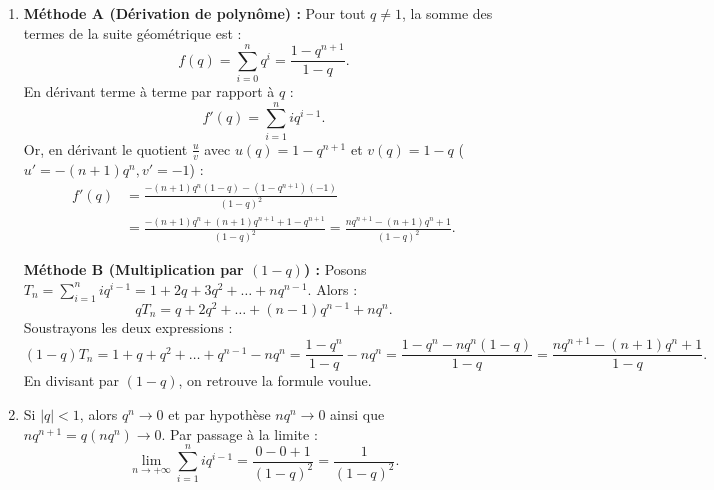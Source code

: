 \documentclass[11pt,a4paper]{article}
\begin{document}
\begin{correctionbox}
\begin{enumerate}
    \item
    \textbf{Méthode A (Dérivation de polynôme) :}
    Pour tout $q \ne 1$, la somme des termes de la suite géométrique est :
    \[
    f(q) = \sum_{i=0}^n q^i = \frac{1 - q^{n+1}}{1 - q}.
    \]
    En dérivant terme à terme par rapport à $q$ :
    \[
    f'(q) = \sum_{i=1}^n i q^{i-1}.
    \]
    Or, en dérivant le quotient $\frac{u}{v}$ avec $u(q) = 1 - q^{n+1}$ et $v(q) = 1 - q$ ($u' = -(n+1)q^n, v' = -1$) :
    \begin{align*}
    f'(q) &= \frac{-(n+1)q^n (1-q) - (1-q^{n+1})(-1)}{(1-q)^2} \\
    &= \frac{-(n+1)q^n + (n+1)q^{n+1} + 1 - q^{n+1}}{(1-q)^2} = \frac{n q^{n+1} - (n+1)q^n + 1}{(1-q)^2}.
    \end{align*}

    \textbf{Méthode B (Multiplication par $(1-q)$) :}
    Posons $T_n = \sum_{i=1}^n i q^{i-1} = 1 + 2q + 3q^2 + \dots + n q^{n-1}$. Alors :
    \[
    q T_n = q + 2q^2 + \dots + (n-1)q^{n-1} + n q^n.
    \]
    Soustrayons les deux expressions :
    \[
    (1-q) T_n = 1 + q + q^2 + \dots + q^{n-1} - n q^n = \frac{1 - q^n}{1 - q} - n q^n = \frac{1 - q^n - n q^n(1-q)}{1 - q} = \frac{n q^{n+1} - (n+1)q^n + 1}{1-q}.
    \]
    En divisant par $(1-q)$, on retrouve la formule voulue.
    \item Si $|q| < 1$, alors $q^n \to 0$ et par hypothèse $n q^n \to 0$ ainsi que $n q^{n+1} = q(n q^n) \to 0$.
    Par passage à la limite :
    \[
    \lim_{n \to +\infty} \sum_{i=1}^n i q^{i-1} = \frac{0 - 0 + 1}{(1-q)^2} = \frac{1}{(1-q)^2}.
    \]
\end{enumerate}
\end{correctionbox}
\end{document}
